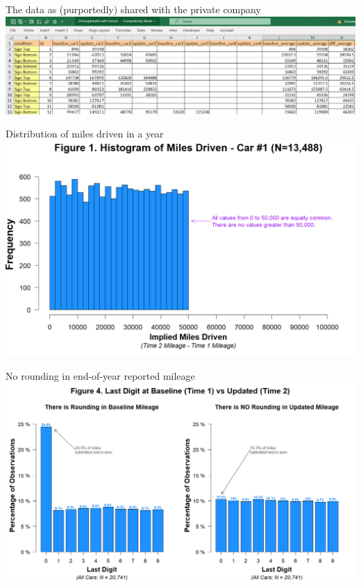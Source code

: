\documentclass[
  ignorenonframetext,
  aspectratio=1610,
]{beamer}
\begin{document}
\begin{frame}{The data as (purportedly) shared with the private company}
\protect\hypertarget{the-data-as-purportedly-shared-with-the-private-company}{}
\includegraphics{exhibit/1-First-introduction-to-data.png}
\end{frame}

\begin{frame}{Distribution of miles driven in a year}
\protect\hypertarget{distribution-of-miles-driven-in-a-year}{}
\includegraphics{exhibit/F1-Uniform-change-2021-07-03.png}
\end{frame}

\begin{frame}{No rounding in end-of-year reported mileage}
\protect\hypertarget{no-rounding-in-end-of-year-reported-mileage}{}
\includegraphics{exhibit/F4-Last-1-digit-2021-07-05.png}
\end{frame}
\end{document}
